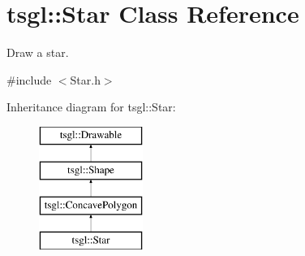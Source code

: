 \hypertarget{classtsgl_1_1_star}{}\section{tsgl\+:\+:Star Class Reference}
\label{classtsgl_1_1_star}


Draw a star.  




{\ttfamily \#include $<$Star.\+h$>$}

Inheritance diagram for tsgl\+:\+:Star\+:\begin{figure}[H]
\begin{center}
\leavevmode
\includegraphics[height=4.000000cm]{classtsgl_1_1_star}
\end{center}
\end{figure}
